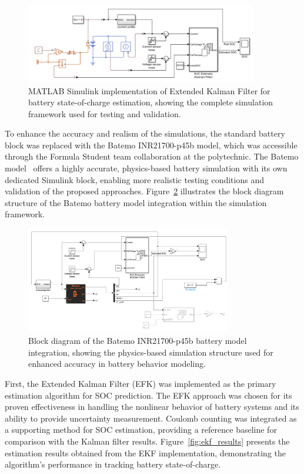 \begin{figure}[htbp]
\centering
\includegraphics[width=0.9\textwidth]{imgs/simulink_EKF.png}
\caption{MATLAB Simulink implementation of Extended Kalman Filter for battery state-of-charge estimation, showing the complete simulation framework used for testing and validation.}
\label{fig:simulink_ekf_implementation}
\end{figure}

To enhance the accuracy and realism of the simulations, the standard battery block was replaced with the Batemo INR21700-p45b model, which was accessible through the Formula Student team collaboration at the polytechnic. The Batemo model~\cite{batemo_website_2024} offers a highly accurate, physics-based battery simulation with its own dedicated Simulink block, enabling more realistic testing conditions and validation of the proposed approaches. Figure~\ref{fig:batemo_blocks} illustrates the block diagram structure of the Batemo battery model integration within the simulation framework.

\begin{figure}[htbp]
\centering
\includegraphics[width=0.8\textwidth]{imgs/batemo_blocks.png}
\caption{Block diagram of the Batemo INR21700-p45b battery model integration, showing the physics-based simulation structure used for enhanced accuracy in battery behavior modeling.}
\label{fig:batemo_blocks}
\end{figure}

First, the Extended Kalman Filter (EFK) was implemented as the primary estimation algorithm for SOC prediction. The EFK approach was chosen for its proven effectiveness in handling the nonlinear behavior of battery systems and its ability to provide uncertainty measurement. Coulomb counting was integrated as a supporting method for SOC estimation, providing a reference baseline for comparison with the Kalman filter results. Figure~\ref{fig:ekf_results} presents the estimation results obtained from the EKF implementation, demonstrating the algorithm's performance in tracking battery state-of-charge.

